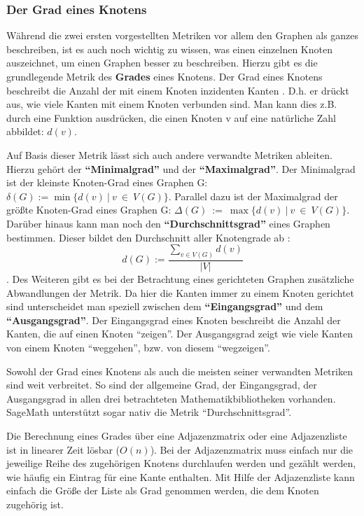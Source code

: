 \documentclass[a4paper,12pt,ngerman,chapterprefix=false,listof=totoc,bibliography=totoc]{scrreprt}
\begin{document}
\subsubsection*{Der Grad eines Knotens}
{
Während die zwei ersten vorgestellten Metriken vor allem den Graphen als ganzes beschreiben, ist es auch noch wichtig zu wissen, was einen einzelnen Knoten auszeichnet, um einen Graphen besser zu beschreiben. Hierzu gibt es die grundlegende Metrik des \textbf{Grades} eines Knotens. Der Grad eines Knotens beschreibt die Anzahl der mit einem Knoten inzidenten Kanten \cite{diestel_graphentheorie_2000}. D.h. er drückt aus, wie viele Kanten mit einem Knoten verbunden sind. Man kann dies z.B. durch eine Funktion ausdrücken, die einen Knoten v auf eine natürliche Zahl abbildet: \(d(v)\).

Auf Basis dieser Metrik lässt sich auch andere verwandte Metriken ableiten. Hierzu gehört der \textbf{"`Minimalgrad"'} und der \textbf{"`Maximalgrad"'}. Der Minimalgrad ist der kleinste Knoten-Grad eines Graphen G: \(\delta (G):=\min\{d(v)\ \vert\ v\ \in\ V(G)\}\). Parallel dazu ist der Maximalgrad der größte Knoten-Grad eines Graphen G: \(\Delta (G)\ :=\ \max\{d(v)\ \vert\ v\ \in\ V(G)\}\). Darüber hinaus kann man noch den \textbf{"`Durchschnittsgrad"'} eines Graphen bestimmen. Dieser bildet den Durchschnitt aller Knotengrade ab \cite{diestel_graphentheorie_2000}:
\[
	d(G):=\frac{\sum_{v\in V(G)}d(v)}{\vert V\vert}
\]. 
Des Weiteren gibt es bei der Betrachtung eines gerichteten Graphen zusätzliche Abwandlungen der Metrik. Da hier die Kanten immer zu einem Knoten gerichtet sind unterscheidet man speziell zwischen dem \textbf{"`Eingangsgrad"'} und dem \textbf{"`Ausgangsgrad"'}. Der Eingangsgrad eines Knoten beschreibt die Anzahl der Kanten, die auf einen Knoten "`zeigen"'. Der Ausgangsgrad zeigt wie viele Kanten von einem Knoten "`weggehen"', bzw. von diesem "`wegzeigen"'. \cite{balakrishnan_schaums_1997}

Sowohl der Grad eines Knotens als auch die meisten seiner verwandten Metriken sind weit verbreitet. So sind der allgemeine Grad, der Eingangsgrad, der Ausgangsgrad in allen drei betrachteten Mathematikbibliotheken vorhanden. SageMath unterstützt sogar nativ die Metrik "`Durchschnittsgrad"'. \cite{sagemath_graph_2020,matlab_directed_2020,wolfram_graph_2020}

Die Berechnung eines Grades über eine Adjazenzmatrix oder eine Adjazenzliste ist in linearer Zeit lösbar (\(O(n)\)). Bei der Adjazenzmatrix muss einfach nur die jeweilige Reihe des zugehörigen Knotens durchlaufen werden und gezählt werden, wie häufig ein Eintrag für eine Kante enthalten. Mit Hilfe der Adjazenzliste kann einfach die Größe der Liste als Grad genommen werden, die dem Knoten zugehörig ist.
}
\end{document}
